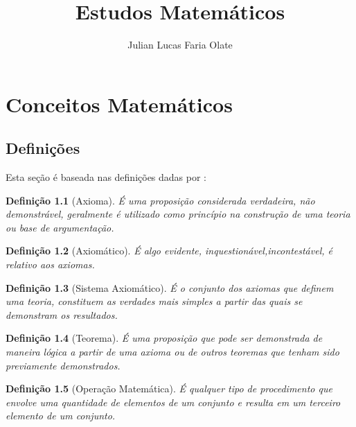 \documentclass{book}
\title{Estudos Matemáticos}
\author{Julian Lucas Faria Olate}
\newtheorem{defi}{Definição}[section]
\begin{document}
    \maketitle
    \tableofcontents

    \chapter{Conceitos Matemáticos}\label{ch:conceitos-matemáticos}
        \section{Definições}\label{sec:definicoes}
            Esta seção é baseada nas definições dadas por \cite{dos-santos2014}:

            \begin{defi}[Axioma]\label{defi:axioma}
                É uma proposição considerada verdadeira, não demonstrável, geralmente é utilizado como princípio na construção de uma teoria ou base de argumentação.
            \end{defi}

            \begin{defi}[Axiomático]\label{defi:axiomatico}
                É algo evidente, inquestionável,\newline incontestável, é relativo aos axiomas.
            \end{defi}

            \begin{defi}[Sistema Axiomático]\label{defi:sistema-axiomatico}
                É o conjunto dos axiomas que definem uma teoria, constituem as verdades mais simples a partir das quais se demonstram os resultados.
            \end{defi}

            \begin{defi}[Teorema]\label{defi:teorema}
                É uma proposição que pode ser demonstrada de maneira lógica a partir de uma axioma ou de outros teoremas que tenham sido previamente demonstrados.
            \end{defi}

            \begin{defi}[Operação Matemática]\label{defi:operacao-matematica}
                É qualquer tipo de procedimento que envolve uma quantidade de elementos de um conjunto e resulta em um terceiro elemento de um conjunto.
            \end{defi}
\end{document}
